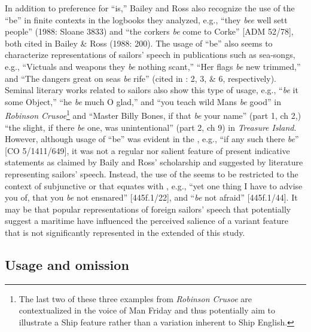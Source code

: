 In addition to preference for “is,” Bailey and Ross also recognize the use of the   “be” in finite contexts in the logbooks they analyzed, e.g., “they \textit{bee} well sett people” (1988: Sloane 3833) and “the corkers \textit{be} come to Corke” [ADM 52/78], both cited in Bailey \& Ross (1988: 200). The usage of  “be” also seems to characterize representations of sailors’ speech in publications such as sea-songs, e.g., “Victuals and weapons they \textit{be} nothing scant,” “Her flags \textit{be} new trimmed,” and “The dangers great on seas \textit{be} rife” (cited in \citealt{Palmer1986}: 2, 3, \& 6, respectively). Seminal literary works related to sailors also show this type of usage, e.g., “\textit{be} it some Object,” “he \textit{be} much O glad,” and “you teach wild Mans \textit{be} good” in  \textit{Robinson Crusoe}\footnote{The last two of these three examples from \textit{Robinson Crusoe} are contextualized in the voice of Man Friday and thus potentially aim to illustrate a Ship  feature rather than a variation inherent to Ship English.}  and “Master Billy Bones, if that \textit{be} your name” (part 1, ch 2,) “the slight, if there \textit{be} one, was unintentional” (part 2, ch 9) in  \textit{Treasure Island}. However, although usage of  “be” was evident in the , e.g., “if any such there \textit{be}” [CO 5/1411/649], it was not a regular nor salient feature of present indicative statements as claimed by Baily and Ross’ scholarship and suggested by literature representing sailors’ speech. Instead, the use of the   seems to be restricted to the context of subjunctive or  that equates with , e.g., “yet one thing I have to advise you of, that you \textit{be} not ensnared” [445f.1/22], and “\textit{be} not afraid” [445f.1/44]. It may be that popular representations of foreign sailors’ speech that potentially suggest a maritime  have influenced the perceived salience of a variant   feature that is not significantly represented in the extended  of this study. 

\subsection{{Usage and omission}  }\label{sec:6.3.2}


